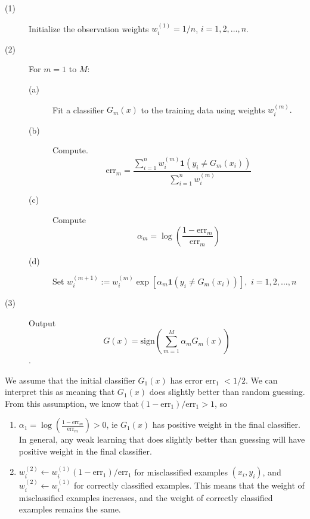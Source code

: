 \documentclass[11pt,twoside]{article}%
\theoremstyle{change}
\begin{document}
\begin{description}
\item[(1)] Initialize the observation weights $w_{i}^{(1)}=1/n$,
$i=1,2,\ldots,n$.

\item[(2)] For $m=1$ to $M$:

\begin{description}
\item[(a)] Fit a classifier $G_{m}(x)$ to the training data using weights
$w_{i}^{(m)}.$

\item[(b)] Compute.%
\[
\mathrm{err}_{m}=\frac{\sum_{i=1}^{n}w_{i}^{(m)}\mathbf{1}\left(  y_{i}\neq
G_{m}(x_{i})\right)  }{\sum_{i=1}^{n}w_{i}^{(m)}}%
\]


\item[(c)] Compute%
\[
\alpha_{m}=\log\left(  \frac{1-\mathrm{err}_{m}}{\mathrm{err}_{m}}\right)
\]


\item[(d)] Set $w_{i}^{(m+1)}:=w_{i}^{(m)}\exp\left[  \alpha_{m}%
\mathbf{1}\left(  y_{i}\neq G_{m}(x_{i})\right)  \right]  ,$ $i=1,2,\ldots,n$
\end{description}

\item[(3)] Output%
\begin{equation}
G(x)=\mathrm{sign}\left(  \sum_{m=1}^{M}\alpha_{m}G_{m}(x)\right) \label{10.1}%
\end{equation}
.
\end{description}

We assume that the initial classifier $G_{1}(x)$ has error $\mathrm{err}_{1}$
$<1/2$. We can interpret this as meaning that $G_{1}(x)$ does slightly better
than random guessing. From this assumption, we know that$(1-\mathrm{err}%
_{1})/\mathrm{err}_{1}>1$, so

\begin{enumerate}
\item $\alpha_{1}=\log\left(  \frac{1-\mathrm{err}_{m}}{\mathrm{err}_{m}%
}\right)  >0$, ie $G_{1}(x)$ has positive weight in the final classifier. In
general, any weak learning that does slightly better than guessing will have
positive weight in the final classifier.

\item $w_{i}^{(2)}\longleftarrow w_{i}^{(1)}\left(  1-\mathrm{err}_{1}\right)
/\mathrm{err}_{1}$ for misclassified examples $\left(  x_{i},y_{i}\right)  $,
and $w_{i}^{(2)}\longleftarrow w_{i}^{(1)}$ for correctly classified examples.
This means that the weight of misclassified examples increases, and the weight
of correctly classified examples remains the same.
\end{enumerate}
\end{document}
